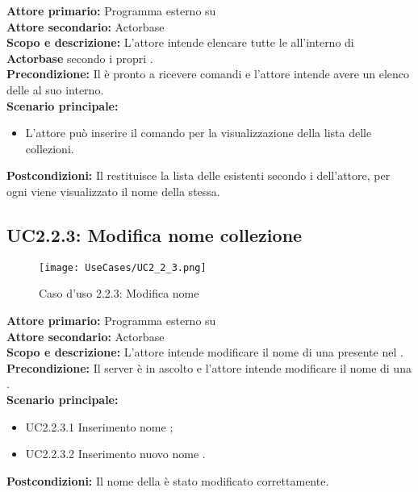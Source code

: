 \documentclass{scalatekids-article}
\begin{document}
\textbf{Attore primario:} Programma esterno su \\
\textbf{Attore secondario:} Actorbase\\
\textbf{Scopo e descrizione:} L'attore intende elencare tutte le  all'interno di \textbf{Actorbase} secondo i propri .\\
\textbf{Precondizione:} Il  è pronto a ricevere comandi e l'attore intende avere un elenco delle  al suo interno.\\
\textbf{Scenario principale:}
\begin{itemize}
\item L'attore può inserire il comando per la visualizzazione della lista delle collezioni.
\end{itemize}
\textbf{Postcondizioni:} Il  restituisce la lista delle  esistenti secondo i  dell'attore, per ogni  viene visualizzato il nome della  stessa.

\subsection{UC2.2.3: Modifica nome collezione}

\begin{figure}[H]
  \begin{center}
    \texttt{[image: UseCases/UC2\_2\_3.png]}
    \caption{Caso d'uso 2.2.3: Modifica nome }
  \end{center}
\end{figure}
\textbf{Attore primario:} Programma esterno su \\
\textbf{Attore secondario:} Actorbase\\
\textbf{Scopo e descrizione:} L'attore intende modificare il nome di una  presente nel .\\
\textbf{Precondizione:} Il server è in ascolto e l’attore intende modificare il nome di una .\\
\textbf{Scenario principale:}
\begin{itemize}
\item UC2.2.3.1 Inserimento nome ;
\item UC2.2.3.2 Inserimento nuovo nome .
\end{itemize}
\textbf{Postcondizioni:} Il nome della  è stato modificato correttamente.
\end{document}
